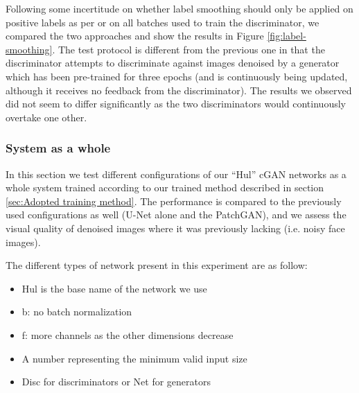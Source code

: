 Following some incertitude on whether label smoothing should only be applied on positive labels as per \cite{gantechniques} or on all batches used to train the discriminator, we compared the two approaches and show the results in Figure \ref{fig:label-smoothing}. The test protocol is different from the previous one in that the discriminator attempts to discriminate against images denoised by a generator which has been pre-trained for three epochs (and is continuously being updated, although it receives no feedback from the discriminator). The results we observed did not seem to differ significantly as the two discriminators would continuously overtake one other.

\subsubsection{System as a whole}\label{sec:System as a whole}

In this section we test different configurations of our ``Hul'' \ac{cGAN} networks as a whole system trained according to our trained method described in section \ref{sec:Adopted training method}. The performance is compared to the previously used configurations as well (U-Net alone and the PatchGAN), and we assess the visual quality of denoised images where it was previously lacking (i.e. noisy face images).

The different types of network present in this experiment are as follow:
\begin{itemize}
  \item Hul is the base name of the network we use
  \item b: no batch normalization
  \item f: more channels as the other dimensions decrease
  \item A number representing the minimum valid input size
  \item Disc for discriminators or Net for generators
\end{itemize}



